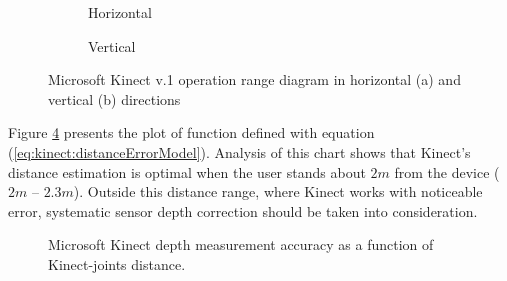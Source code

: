 \documentclass[sensors,article,submit,moreauthors,pdftex,10pt,a4paper]{mdpi}
\begin{document}
\begin{figure}[H]
	\centering
	\begin{subfigure}[b]{0.4\textwidth}
		\centering
		
		\caption{Horizontal}
		\label{fig:kinect:range:a}
	\end{subfigure} \hfill
	\begin{subfigure}[b]{0.4\textwidth}
		\centering
		
		\caption{Vertical}
		\label{fig:kinect:range:b}
	\end{subfigure} \hfill
	\begin{subfigure}[p]{0.18\textwidth}
		\hfill
		               
	\end{subfigure}
	\caption{Microsoft Kinect v.1 operation range diagram in horizontal (a) and vertical (b) directions}
	\label{fig:kinect:range}
\end{figure}   

Figure \ref{fig:kinect:distanceAccuracy} presents the plot of function defined with equation (\ref{eq:kinect:distanceErrorModel}). Analysis of this chart shows that Kinect’s distance estimation is optimal when the user stands about $2m$ from the device ($2m$ – $2.3m$). Outside this distance range, where Kinect works with noticeable error, systematic sensor depth correction should be taken into consideration.

\begin{figure}[H]
	\centering	
											
	\caption{Microsoft Kinect depth measurement accuracy as a function of Kinect-joints distance.}
	\label{fig:kinect:distanceAccuracy}
\end{figure}
\end{document}

